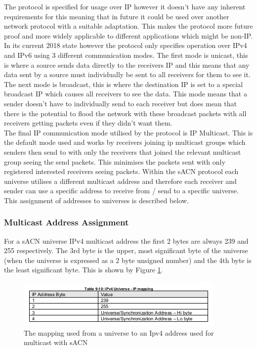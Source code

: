 \documentclass[11pt,a4paper]{article}
\begin{document}
The protocol is specified for usage over IP however it doesn't have any inherent requirements for this meaning that in future it could be used over another network protocol with a suitable adaptation. This makes the protocol more future proof and more widely applicable to different applications which might be non-IP. In its current 2018 state however the protocol only specifies operation over IPv4 and IPv6 using 3 different communication modes. The first mode is unicast, this is where a source sends data directly to the receivers IP and this means that any data sent by a source must individually be sent to all receivers for them to see it. The next mode is broadcast, this is where the destination IP is set to a special broadcast IP which causes all receivers to see the data. This mode means that a sender doesn't have to individually send to each receiver but does mean that there is the potential to flood the network with these broadcast packets with all receivers getting packets even if they didn't want them.\\

The final IP communication mode utilised by the protocol is IP Multicast. This is the default mode used and works by receivers joining ip multicast groups which senders then send to with only the receivers that joined the relevant multicast group seeing the send packets. This minimises the packets sent with only registered interested receivers seeing packets. Within the sACN protocol each universe utilises a different multicast address and therefore each receiver and sender can use a specific address to receive from / send to a specific universe. This assignment of addresses to universes is described below.\\

\subsubsection{Multicast Address Assignment}
For a sACN universe IPv4 multicast address the first 2 bytes are always 239 and 255 respectively. The 3rd byte is the upper, most significant byte of the universe (when the universe is expressed as a 2 byte unsigned number) and the 4th byte is the least significant byte. This is shown by Figure \ref{IPV4_MULTICAST_MAPPING}.

\begin{figure}[H]
\label{IPV4_MULTICAST_MAPPING}
\includegraphics[width=\textwidth]{Ipv4MulticastMapping}
\caption{The mapping used from a universe to an Ipv4 address used for multicast with sACN}
\end{figure}
\end{document}
